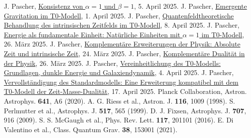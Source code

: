 \documentclass[12pt,a4paper]{article}
\begin{document}
\begin{thebibliography}{99}
		 J. Pascher, \href{https://github.com/jpascher/T0-Time-Mass-Duality/tree/main/2/pdf/Deutsch/Alpha1Beta1Konsistenz.pdf}{Konsistenz von \(\alpha = 1\) und \(\beta = 1\)}, 5. April 2025.
		 J. Pascher, \href{https://github.com/jpascher/T0-Time-Mass-Duality/tree/main/2/pdf/Deutsch/EmergentGravT0.pdf}{Emergente Gravitation im T0-Modell}, 1. April 2025.
		 J. Pascher, \href{https://github.com/jpascher/T0-Time-Mass-Duality/tree/main/2/pdf/Deutsch/QFTIntrinsischesZeitT0.pdf}{Quantenfeldtheoretische Behandlung des intrinsischen Zeitfelds im T0-Modell}, 8. April 2025.
		 J. Pascher, \href{https://github.com/jpascher/T0-Time-Mass-Duality/tree/main/2/pdf/Deutsch/NatEinheitenAlpha1.pdf}{Energie als fundamentale Einheit: Natürliche Einheiten mit \(\alpha = 1\) im T0-Modell}, 26. März 2025.
		 J. Pascher, \href{https://github.com/jpascher/T0-Time-Mass-Duality/tree/main/2/pdf/Deutsch/KomplementPhysikZeit.pdf}{Komplementäre Erweiterungen der Physik: Absolute Zeit und intrinsische Zeit}, 24. März 2025.
		 J. Pascher, \href{https://github.com/jpascher/T0-Time-Mass-Duality/tree/main/2/pdf/Deutsch/KurzKomplementDualPhysik.pdf}{Komplementäre Dualität in der Physik}, 26. März 2025.
		 J. Pascher, \href{https://github.com/jpascher/T0-Time-Mass-Duality/tree/main/2/pdf/Deutsch/T0VereinheitlichungDEGal.pdf}{Vereinheitlichung des T0-Modells: Grundlagen, dunkle Energie und Galaxiendynamik}, 4. April 2025.
		 J. Pascher, \href{https://github.com/jpascher/T0-Time-Mass-Duality/tree/main/2/pdf/Deutsch/StandardModKruemmungRotv.pdf}{Vervollständigung des Standardmodells: Eine Erweiterung kompatibel mit dem T0-Modell der Zeit-Masse-Dualität}, 17. April 2025.
		 Planck Collaboration, Astron. Astrophys. \textbf{641}, A6 (2020).
		 A. G. Riess et al., Astron. J. \textbf{116}, 1009 (1998).
		 S. Perlmutter et al., Astrophys. J. \textbf{517}, 565 (1999).
		 D. J. Fixsen, Astrophys. J. \textbf{707}, 916 (2009).
		 S. S. McGaugh et al., Phys. Rev. Lett. \textbf{117}, 201101 (2016).
		 E. Di Valentino et al., Class. Quantum Grav. \textbf{38}, 153001 (2021).
	\end{thebibliography}
	
\end{document}
